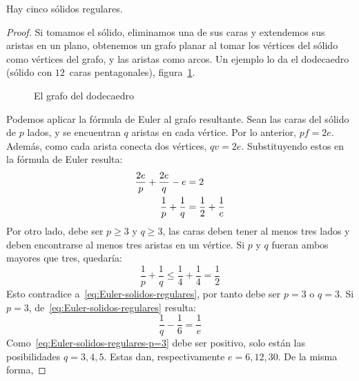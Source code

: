   \begin{theorem}
    Hay cinco sólidos regulares.
  \end{theorem}
  \begin{proof}
    Si tomamos el sólido,
    eliminamos una de sus caras
    y extendemos sus aristas en un plano,
    obtenemos un grafo planar
    al tomar los vértices del sólido como vértices del grafo,
    y las aristas como arcos.
    Un ejemplo lo da el dodecaedro
    (sólido con \(12\)~caras pentagonales),
    figura~\ref{fig:dodecaedro}.
    \begin{figure}[htbp]
      \centering
      \caption{El grafo del dodecaedro}
      \label{fig:dodecaedro}
    \end{figure}
    Podemos aplicar la fórmula de Euler al grafo resultante.%
    Sean las caras del sólido de \(p\) lados,
    y se encuentran \(q\) aristas en cada vértice.
    Por lo anterior,
    \(p f = 2 e\).
    Además,
    como cada arista conecta dos vértices,
    \(q v = 2 e\).
    Substituyendo estos en la fórmula de Euler
    resulta:
    \begin{align}
      \frac{2 e}{p} + \frac{2 e}{q} - e
	&= 2 \notag \\
      \frac{1}{p} + \frac{1}{q}
	&= \frac{1}{2} + \frac{1}{e}
	     \label{eq:Euler-solidos-regulares}
    \end{align}
    Por otro lado,
    debe ser \(p \ge 3\) y \(q \ge 3\),
    las caras deben tener al menos tres lados
    y deben encontrarse al menos tres aristas en un vértice.
    Si \(p\) y \(q\) fueran ambos mayores que tres,
    quedaría:
    \begin{equation*}
      \frac{1}{p} + \frac{1}{q}
	\le \frac{1}{4} + \frac{1}{4}
	= \frac{1}{2}
    \end{equation*}
    Esto contradice a~\eqref{eq:Euler-solidos-regulares},
    por tanto debe ser \(p = 3\) o \(q = 3\).
    Si \(p = 3\),
    de~\eqref{eq:Euler-solidos-regulares} resulta:
    \begin{equation}
      \label{eq:Euler-solidos-regulares-p=3}
      \frac{1}{q} - \frac{1}{6}
	= \frac{1}{e}
    \end{equation}
    Como~\eqref{eq:Euler-solidos-regulares-p=3} debe ser positivo,
    solo están las posibilidades \(q = 3, 4, 5\).
    Estas dan,
    respectivamente \(e = 6, 12, 30\).
    De la misma forma,

\end{proof}
